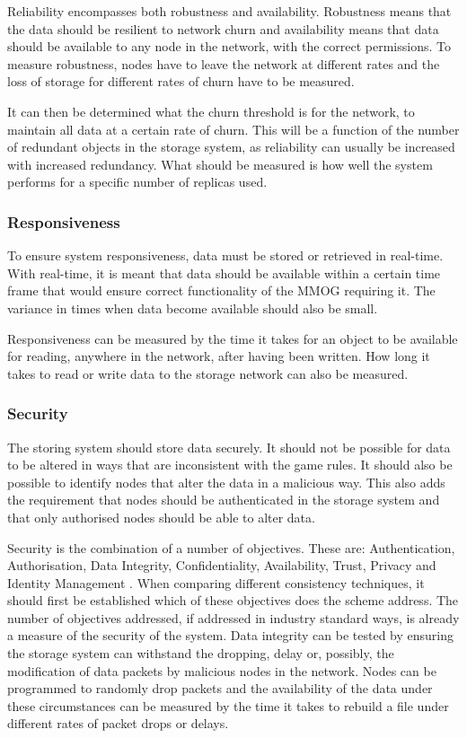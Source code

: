 \documentclass[10pt,a4paper,journal,cspaper,compsoc]{IEEEtran}
\begin{document}
Reliability encompasses both robustness and availability. Robustness means that the data should be resilient to network churn and availability means
that data should be available to any node in the network, with the correct permissions. To measure robustness, nodes have to leave the network at
different rates and the loss of storage for different rates of churn have to be measured.

It can then be determined what the churn threshold is for the network, to maintain all data at a certain rate of churn. This will be a function of
the number of redundant objects in the storage system, as reliability can usually be increased with increased redundancy. What should be measured is
how well the system performs for a specific number of replicas used.

\subsubsection{Responsiveness}
To ensure system responsiveness, data must be stored or retrieved in real-time. With real-time, it is meant that data should be available within a
certain time frame that would ensure correct functionality of the MMOG requiring it. The variance in times when data become available should also be
small.

Responsiveness can be measured by the time it takes for an object to be available for reading, anywhere in the network, after having been written.
How long it takes to read or write data to the storage network can also be measured.

\subsubsection{Security}
The storing system should store data securely. It should not be possible for data to be altered in ways that are inconsistent with the game rules. It
should also be possible to identify nodes that alter the data in a malicious way. This also adds the requirement that nodes should be authenticated
in the storage system and that only authorised nodes should be able to alter data.

Security is the combination of a number of objectives. These are: Authentication, Authorisation, Data Integrity, Confidentiality, Availability,
Trust, Privacy and Identity Management \cite{distributed_systems_security}. When comparing different consistency techniques, it should first be
established which of these objectives does the scheme address. The number of objectives addressed, if addressed in industry standard ways, is already
a measure of the security of the system. Data integrity can be tested by ensuring the storage system can withstand the dropping, delay or, possibly,
the modification of data packets by malicious nodes in the network. Nodes can be programmed to randomly drop packets and the availability of the data
under these circumstances can be measured by the time it takes to rebuild a file under different rates of packet drops or delays.
\end{document}
